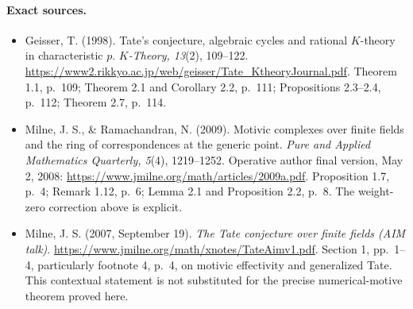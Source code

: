 \paragraph{Exact sources.}
\begin{itemize}
\item Geisser, T. (1998). Tate's conjecture, algebraic cycles and
rational $K$-theory in characteristic $p$. \emph{$K$-Theory,
13}(2), 109--122.
\url{https://www2.rikkyo.ac.jp/web/geisser/Tate_KtheoryJournal.pdf}.
Theorem 1.1, p.~109; Theorem 2.1 and Corollary 2.2, p.~111;
Propositions 2.3--2.4, p.~112; Theorem 2.7, p.~114.
\item Milne, J. S., \& Ramachandran, N. (2009). Motivic complexes
over finite fields and the ring of correspondences at the generic
point. \emph{Pure and Applied Mathematics Quarterly, 5}(4),
1219--1252. Operative author final version, May 2, 2008:
\url{https://www.jmilne.org/math/articles/2009a.pdf}.
Proposition 1.7, p.~4; Remark 1.12, p.~6; Lemma 2.1 and
Proposition 2.2, p.~8. The weight-zero correction above is explicit.
\item Milne, J. S. (2007, September 19). \emph{The Tate conjecture
over finite fields (AIM talk)}.
\url{https://www.jmilne.org/math/xnotes/TateAimv1.pdf}.
Section 1, pp.~1--4, particularly footnote 4, p.~4, on motivic
effectivity and generalized Tate. This contextual statement is
not substituted for the precise numerical-motive theorem proved here.
\end{itemize}

